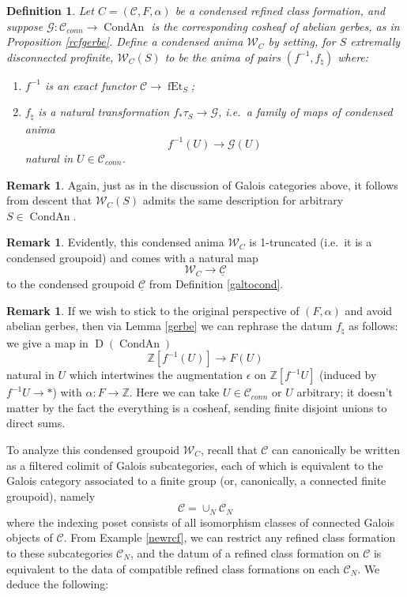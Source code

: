 \documentclass[12pt]{article}
\newtheorem{definition}[theorem]{Definition}
\theoremstyle{definition}
\newtheorem{remark}[theorem]{Remark}
\newcommand{\on}{\operatorname}
\newcommand{\mc}{\mathcal}
\newcommand{\mbb}{\mathbb}
\newcommand{\ul}{\underline}
\begin{document}
\begin{definition}\label{rcftocond}
Let $C=(\mc{C},F,\alpha)$ be a condensed refined class formation, and suppose $\mc{G}:\mc{C}_{conn}\to\on{CondAn}$ is the corresponding cosheaf of abelian gerbes, as in Proposition \ref{rcfgerbe}.  Define a condensed anima $\mathcal{W}_C$ by setting, for $S$ extremally disconnected profinite, $\mathcal{W}_C(S)$ to be the anima of pairs $(f^{-1},f_\natural)$ where:
\begin{enumerate}
\item $f^{-1}$ is an exact functor $\mc{C} \to \on{fEt}_S$;
\item $f_\natural$ is a natural transformation $f_\ast \tau_S \to \mc{G}$, i.e.\ a family of maps of condensed anima
$$f^{-1}(U)\to \mc{G}(U)$$
natural in $U\in\mc{C}_{conn}$.
\end{enumerate}
\end{definition}

\begin{remark}
Again, just as in the discussion of Galois categories above, it follows from descent that $\mathcal{W}_C(S)$ admits the same description for arbitrary $S\in\on{CondAn}$.
\end{remark}

\begin{remark}
Evidently,  this condensed anima $\mathcal{W}_C$ is 1-truncated (i.e.\ it is a condensed groupoid) and comes with a natural map
$$\mc{W}_C \to \ul{\mc{C}}$$
to the condensed groupoid $\ul{\mc{C}}$ from Definition \ref{galtocond}.
\end{remark}

\begin{remark}
If we wish to stick to the original perspective of $(F,\alpha)$ and avoid abelian gerbes, then via Lemma \ref{gerbe} we can rephrase the datum $f_\natural$ as follows: we give a map in $\on{D}(\on{CondAn})$
$$\mbb{Z}[f^{-1}(U)]\to F(U)$$
natural in $U$ which intertwines the augmentation $\epsilon$ on $\mbb{Z}[f^{-1}U]$ (induced by $f^{-1}U\to \ast$) with $\alpha:F\to\mbb{Z}$.  Here we can take $U\in\mc{C}_{conn}$ or $U$ arbitrary; it doesn't matter by the fact the everything is a cosheaf, sending finite disjoint unions to direct sums.
\end{remark}

To analyze this condensed groupoid $\mc{W}_C$, recall that $\mc{C}$ can canonically be written as a filtered colimit of Galois subcategories, each of which is equivalent to the Galois category associated to a finite group (or, canonically, a connected finite groupoid), namely
$$\mc{C} = \cup_N \mc{C}_N$$
where the indexing poset consists of all isomorphism classes of connected Galois objects of $\mc{C}$.  From Example \ref{newrcf}, we can restrict any refined class formation to these subcategories $\mc{C}_N$, and the datum of a refined class formation on $\mc{C}$ is equivalent to the data of compatible refined class formations on each $\mc{C}_N$.  We deduce the following:
\end{document}
